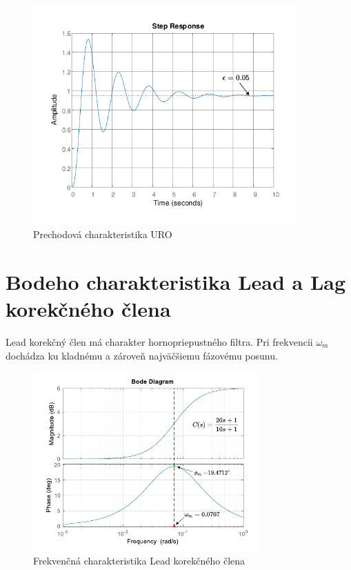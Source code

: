 \documentclass[a4paper,10pt]{article}
\begin{document}
\begin{figure}[ht]
\centering
\includegraphics[width=0.9\textwidth]{prechodova_charakteristika}
\caption{Prechodová charakteristika URO}
\end{figure}

\pagebreak

\section{Bodeho charakteristika Lead a Lag korekčného člena}
Lead korekčný člen má charakter hornopriepustného filtra. Pri frekvencii $\omega_m$ dochádza ku kladnému a zároveň najväčšiemu fázovému posunu.
\begin{figure}[ht]
\centering
\includegraphics[width=0.77\textwidth]{LeadBode}
\caption{Frekvenčná charakteristika Lead korekčného člena}
\end{figure}
\end{document}
